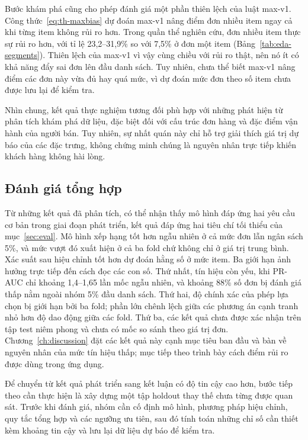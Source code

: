 \documentclass[12pt,a4paper]{report}
\begin{document}
Bước khám phá cũng cho phép đánh giá một phần thiên lệch của luật max-v1. Công thức~\eqref{eq:th-maxbias} dự đoán max-v1 nâng điểm đơn nhiều item ngay cả khi từng item không rủi ro hơn. Trong quần thể nghiên cứu, đơn nhiều item thực sự rủi ro hơn, với tỉ lệ 23,2--31,9\% so với 7,5\% ở đơn một item (Bảng~\ref{tab:eda-segments}). Thiên lệch của max-v1 vì vậy cùng chiều với rủi ro thật, nên nó ít có khả năng đẩy sai đơn lên đầu danh sách. Tuy nhiên, chưa thể biết max-v1 nâng điểm các đơn này vừa đủ hay quá mức, vì dự đoán mức đơn theo số item chưa được lưu lại để kiểm tra.

Nhìn chung, kết quả thực nghiệm tương đối phù hợp với những phát hiện từ phân tích khám phá dữ liệu, đặc biệt đối với cấu trúc đơn hàng và đặc điểm vận hành của người bán. Tuy nhiên, sự nhất quán này chỉ hỗ trợ giải thích giá trị dự báo của các đặc trưng, không chứng minh chúng là nguyên nhân trực tiếp khiến khách hàng không hài lòng.

\subsection{Đánh giá tổng hợp}\label{sec:analysis-summary}

Từ những kết quả đã phân tích, có thể nhận thấy mô hình đáp ứng hai yêu cầu cơ bản trong giai đoạn phát triển, kết quả đáp ứng hai tiêu chí tối thiểu của mục~\ref{sec:eval}. Mô hình xếp hạng tốt hơn ngẫu nhiên ở cả mức đơn lẫn ngân sách 5\%, và mức vượt đó xuất hiện ở cả ba fold chứ không chỉ ở giá trị trung bình. Xác suất sau hiệu chỉnh tốt hơn dự đoán hằng số ở mức item. Ba giới hạn ảnh hưởng trực tiếp đến cách đọc các con số. Thứ nhất, tín hiệu còn yếu, khi PR-AUC chỉ khoảng 1,4--1,65 lần mốc ngẫu nhiên, và khoảng 88\% số đơn bị đánh giá thấp nằm ngoài nhóm 5\% đầu danh sách. Thứ hai, độ chính xác của phép lựa chọn bị giới hạn bởi ba fold; phần lớn chênh lệch giữa các phương án cạnh tranh nhỏ hơn độ dao động giữa các fold. Thứ ba, các kết quả chưa được xác nhận trên tập test niêm phong và chưa có mốc so sánh theo giá trị đơn. Chương~\ref{ch:discussion} đặt các kết quả này cạnh mục tiêu ban đầu và bàn về nguyên nhân của mức tín hiệu thấp; mục tiếp theo trình bày cách điểm rủi ro được dùng trong ứng dụng.

Để chuyển từ kết quả phát triển sang kết luận có độ tin cậy cao hơn, bước tiếp theo cần thực hiện là xây dựng một tập holdout thay thế chưa từng được quan sát. Trước khi đánh giá, nhóm cần cố định mô hình, phương pháp hiệu chỉnh, quy tắc tổng hợp và các ngưỡng ưu tiên, sau đó tính toán những chỉ số cần thiết kèm khoảng tin cậy và lưu lại dữ liệu dự báo để kiểm tra.
\end{document}
